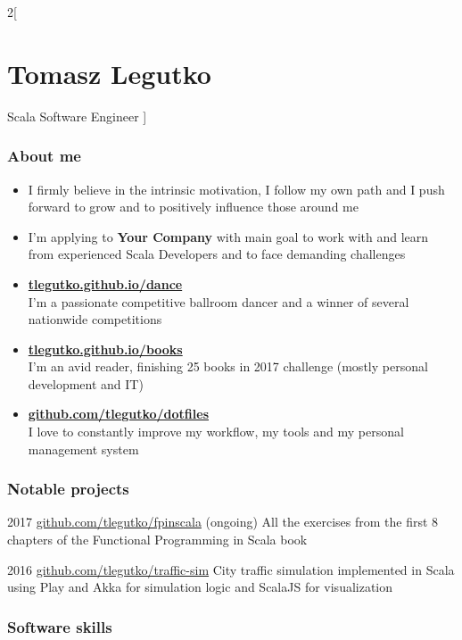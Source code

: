 \documentclass{tccv}
\begin{document}
\begin{multicols}{2}[
\part{Tomasz Legutko}{Scala Software Engineer}
]
\section{About me}
\begin{itemize}[noitemsep,topsep=0pt]
\item I firmly believe in the intrinsic motivation, I follow my own path and I push forward to grow and to positively influence those around me
\item I'm applying to {\bfseries Your Company} with main goal to work with and learn from experienced Scala Developers and to face demanding challenges
\item {\bfseries\href{https://tlegutko.github.io/dance}{tlegutko.github.io/dance}}\\
  I'm a passionate competitive ballroom dancer and a winner of several nationwide competitions
\item {\bfseries\href{https://tlegutko.github.io/books}{tlegutko.github.io/books}}\\
  I'm an avid reader, finishing 25 books in 2017 challenge (mostly personal development and IT)
\item {\bfseries\href{https://github.com/tlegutko/dotfiles}{github.com/tlegutko/dotfiles}}\\
  I love to constantly improve my workflow, my tools and my personal management system

\end{itemize}

\section{Notable projects}
\begin{yearlist}

\item{2017}
     {\href{https://github.com/tlegutko/fpinscala}{github.com/tlegutko/fpinscala} (ongoing)}
     {All the exercises from the first 8 chapters of the Functional Programming in Scala book}

\item{2016}
     {\href{https://github.com/tlegutko/traffic-sim}{github.com/tlegutko/traffic-sim}}
     {City traffic simulation implemented in Scala using Play and Akka for simulation logic and ScalaJS for visualization}

\end{yearlist}

\section{Software skills}


\end{multicols}
\end{document}
